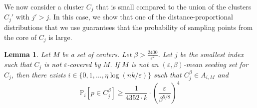 \documentclass[10pt,a4paper]{amsart}
\newtheorem{lemma}[theorem]{Lemma}
\newcommand{\cs}[1]{{\textcolor{red}{#1}}{}}
\providecommand{\cal}{\mathcal}
\begin{document}
We now consider a cluster $C_j$ that is small compared to the union of the clusters $C_j'$ with $j'>j$. In this case, we show that one of the distance-proportional distributions that we use guarantees that the probability of sampling points from the core of $C_j$ is large.

\begin{lemma}
\label{lem:refinedsample}
 Let $M$ be a set of centers. Let $\beta> \frac{2400}{\varepsilon^{2}}$. Let $j$ be the smallest index 
 such that $C_j$ is not $\varepsilon$-covered by $M$. If $M$ is not an $(\varepsilon,\beta)$-mean seeding
 set for $C_j$, then there exists $i\in \{0,1,\ldots,\eta\log (nk/\varepsilon)\}$ such that 
 $C_j^\beta \in A_{i,M}$ and
$$\mathbb{P}_i[p\in C_j^\beta]\geq \frac{1}{4352\cdot k}\cdot \left(\frac{\varepsilon}{\beta^{5/8}}\right)^4$$
\end{lemma}
\end{document}
